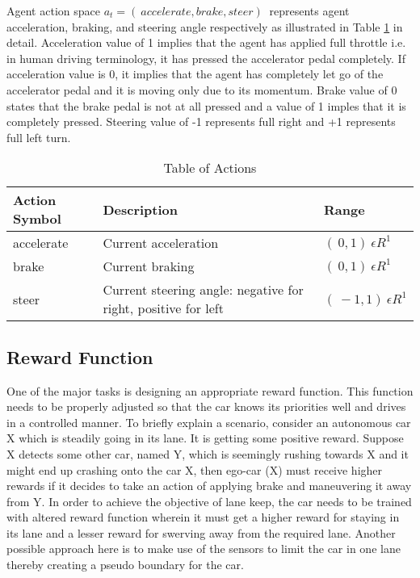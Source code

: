 Agent action space $a_t = (\ accelerate, brake, steer )\ $ represents agent acceleration, braking, and steering angle
respectively as illustrated in Table \ref{table:2} in detail.
Acceleration value of 1 implies that the agent has applied full throttle i.e. in human driving terminology, it has pressed the accelerator pedal completely. If acceleration value is 0, it implies that the agent has completely let go of the accelerator pedal and it is moving only due to its momentum. 
Brake value of 0 states that the brake pedal is not at all pressed and a value of 1 imples that it is completely pressed. 
Steering value of -1 represents full right and +1 represents full left turn.  
\\
\begin{table}[h]
	\centering
	\caption{Table of Actions \cite{huang2019end}}
	\smallskip
	\begin{tabular}{ |p{3.1cm}|p{6cm}|p{3cm}|  }
		
		\hline
		\textbf{Action Symbol}  & \textbf{Description}  &\textbf{Range} \\
		
		\hline
		\hline
		accelerate & Current acceleration &$ (\ 0, 1)\ \epsilon R^1 $ \\
		\hline
		brake & Current braking   & $(\ 0, 1)\ \epsilon R^1 $ \\
		\hline
		steer &Current steering angle: negative for right, positive for left & $(\ -1, 1)\ \epsilon R^1$ \\
		\hline
		
	\end{tabular}
	
	\label{table:2}
\end{table}

\subsection{Reward Function }

One of the major tasks is designing an appropriate reward function. This function needs to be properly adjusted so that the car knows its priorities well and drives in a controlled manner. To briefly explain a scenario, consider an autonomous car X which is steadily going in its lane. It is getting some positive reward. Suppose X detects some other car, named Y, which is seemingly rushing towards X and it might end up crashing onto the car X, then ego-car (X) must receive higher rewards if it decides to take an action of applying brake and maneuvering it away from Y. In order to achieve the objective of lane keep, the car needs to be trained with altered reward function wherein it must get a higher reward for staying in its lane and a lesser reward for swerving away from the required lane. Another possible approach here is to make use of the sensors to limit the car in one lane thereby creating a pseudo boundary for the car. 

